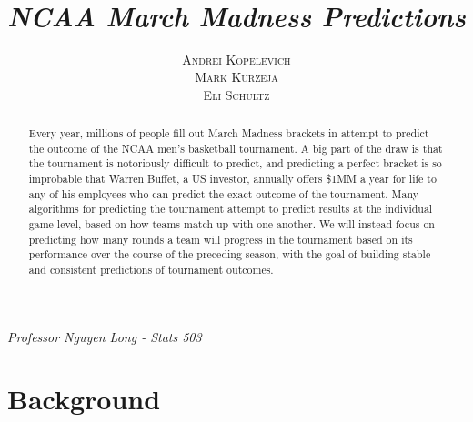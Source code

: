 \documentclass[10pt,a4paper, hidelinks]{article} %
\begin{document}
\pagestyle{plain} 
\title{\color{harvard}\rmfamily{} \\ \vspace{-.4cm}\hfill\\ {\LARGE \textit{NCAA March Madness Predictions}}}
\author{\textsc{Andrei Kopelevich}\\ \textsc{Mark Kurzeja}\\ \textsc{Eli Schultz} }
\date{} %

\maketitle

\mbox{}
\vfill

\begin{center}
	\large \color{harvard}   \textit{Professor Nguyen Long - Stats 503} \\  
\end{center}

\newpage

\hfill
\vspace{1cm}\hfill

\begin{abstract}
	Every year, millions of people fill out March Madness brackets in attempt to predict the outcome of the NCAA men's basketball tournament. A big part of the draw is that the tournament is notoriously difficult to predict, and predicting a perfect bracket is so improbable that Warren Buffet, a US investor, annually offers \$1MM a year for life to any of his employees who can predict the exact outcome of the tournament. Many algorithms for predicting the tournament attempt to predict results at the individual game level, based on how teams match up with one another. We will instead focus on predicting how many rounds a team will progress in the tournament based on its performance over the course of the preceding season, with the goal of building stable and consistent predictions of tournament outcomes.
\end{abstract}
\tableofcontents
\newpage

\section{Background}
\end{document}
